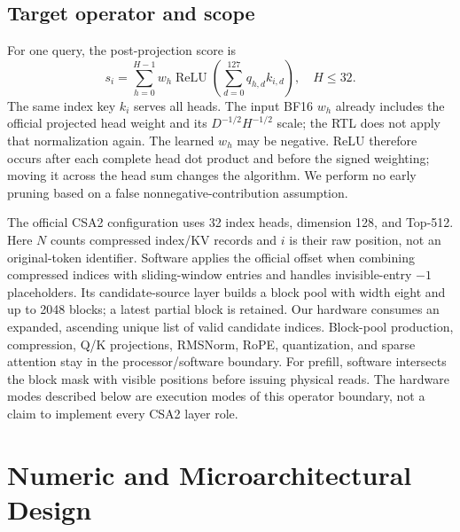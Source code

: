 \documentclass[conference]{IEEEtran}
\begin{document}
\subsection{Target operator and scope}
For one query, the post-projection score is
\begin{equation}
 s_i=\sum_{h=0}^{H-1}w_h\operatorname{ReLU}\!\left(\sum_{d=0}^{127}q_{h,d}k_{i,d}\right),\quad H\le32.
\label{eq:score}
\end{equation}
The same index key $k_i$ serves all heads. The input BF16 $w_h$ already includes the official projected head weight and its $D^{-1/2}H^{-1/2}$ scale; the RTL does not apply that normalization again. The learned $w_h$ may be negative. ReLU therefore occurs after each complete head dot product and before the signed weighting; moving it across the head sum changes the algorithm. We perform no early pruning based on a false nonnegative-contribution assumption.

The official CSA2 configuration uses 32 index heads, dimension 128, and Top-512. Here $N$ counts compressed index/KV records and $i$ is their raw position, not an original-token identifier. Software applies the official offset when combining compressed indices with sliding-window entries and handles invisible-entry $-1$ placeholders. Its candidate-source layer builds a block pool with width eight and up to 2048 blocks; a latest partial block is retained. Our hardware consumes an expanded, ascending unique list of valid candidate indices. Block-pool production, compression, Q/K projections, RMSNorm, RoPE, quantization, and sparse attention stay in the processor/software boundary. For prefill, software intersects the block mask with visible positions before issuing physical reads. The hardware modes described below are execution modes of this operator boundary, not a claim to implement every CSA2 layer role.

\section{Numeric and Microarchitectural Design}
\end{document}
